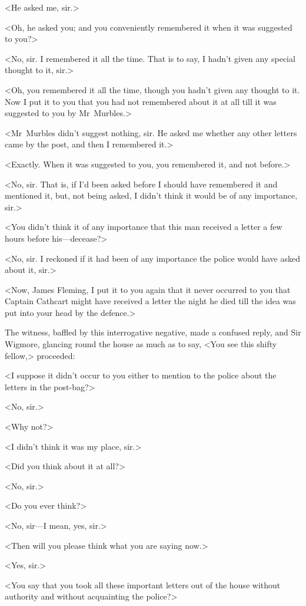 <He asked me, sir.>

<Oh, he asked you; and you conveniently remembered it when it was suggested to you?>

<No, sir. I remembered it all the time. That is to say, I hadn't given any special thought to it, sir.>

<Oh, you remembered it all the time, though you hadn't given any thought to it. Now I put it to you that you had not remembered about it at all till it was suggested to you by Mr~Murbles.>

<Mr~Murbles didn't suggest nothing, sir. He asked me whether any other letters came by the post, and then I remembered it.>

<Exactly. When it was suggested to you, you remembered it, and not before.>

<No, sir. That is, if I'd been asked before I should have remembered it and mentioned it, but, not being asked, I didn't think it would be of any importance, sir.>

<You didn't think it of any importance that this man received a letter a few hours before his—decease?>

<No, sir. I reckoned if it had been of any importance the police would have asked about it, sir.>

<Now, James Fleming, I put it to you again that it never occurred to you that Captain Cathcart might have received a letter the night he died till the idea was put into your head by the defence.>

The witness, baffled by this interrogative negative, made a confused reply, and Sir Wigmore, glancing round the house as much as to say, <You see this shifty fellow,> proceeded:

<I suppose it didn't occur to you either to mention to the police about the letters in the post-bag?>

<No, sir.>

<Why not?>

<I didn't think it was my place, sir.>

<Did you think about it at all?>

<No, sir.>

<Do you ever think?>

<No, sir—I mean, yes, sir.>

<Then will you please think what you are saying now.>

<Yes, sir.>

<You say that you took all these important letters out of the house without authority and without acquainting the police?>

